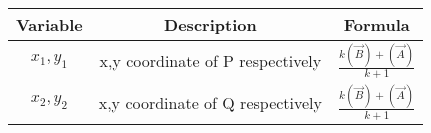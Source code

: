 \begin{tabular}[12pt]{ |c| c |c|}
    \hline
    \textbf{Variable} & \textbf{Description} & \textbf{Formula}\\ 
    \hline
    $x_1,y_1$ & x,y coordinate of P respectively & $\frac{k(\vec{B})+(\vec{A})}{k+1}$ \\
    \hline 
    $x_2,y_2$ & x,y coordinate of Q respectively & $\frac{k(\vec{B})+(\vec{A})}{k+1}$ \\
    \hline  
    \end{tabular}

